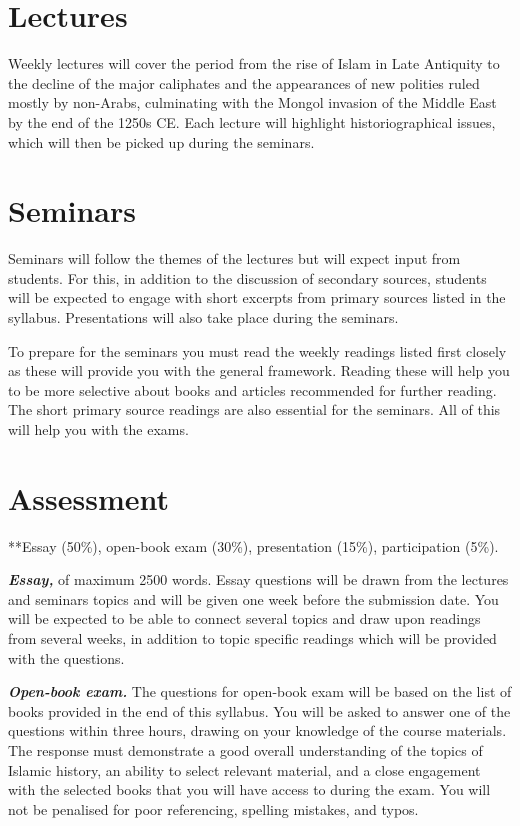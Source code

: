 \documentclass[
]{book}
\begin{document}
\hypertarget{lectures}{%
\section{Lectures}\label{lectures}}

Weekly lectures will cover the period from the rise of Islam in Late Antiquity to the decline of the major caliphates and the appearances of new polities ruled mostly by non-Arabs, culminating with the Mongol invasion of the Middle East by the end of the 1250s CE. Each lecture will highlight historiographical issues, which will then be picked up during the seminars.

\hypertarget{seminars}{%
\section{Seminars}\label{seminars}}

Seminars will follow the themes of the lectures but will expect input from students. For this, in addition to the discussion of secondary sources, students will be expected to engage with short excerpts from primary sources listed in the syllabus. Presentations will also take place during the seminars.

To prepare for the seminars you must read the weekly readings listed first closely as these will provide you with the general framework. Reading these will help you to be more selective about books and articles recommended for further reading. The short primary source readings are also essential for the seminars. All of this will help you with the exams.

\hypertarget{assessment}{%
\section{Assessment}\label{assessment}}

**Essay (50\%), open-book exam (30\%), presentation (15\%), participation (5\%).

\textbf{\emph{Essay,}} of maximum 2500 words. Essay questions will be drawn from the lectures and seminars topics and will be given one week before the submission date. You will be expected to be able to connect several topics and draw upon readings from several weeks, in addition to topic specific readings which will be provided with the questions.

\textbf{\emph{Open-book exam.}} The questions for open-book exam will be based on the list of books provided in the end of this syllabus. You will be asked to answer one of the questions within three hours, drawing on your knowledge of the course materials. The response must demonstrate a good overall understanding of the topics of Islamic history, an ability to select relevant material, and a close engagement with the selected books that you will have access to during the exam. You will not be penalised for poor referencing, spelling mistakes, and typos.
\end{document}
